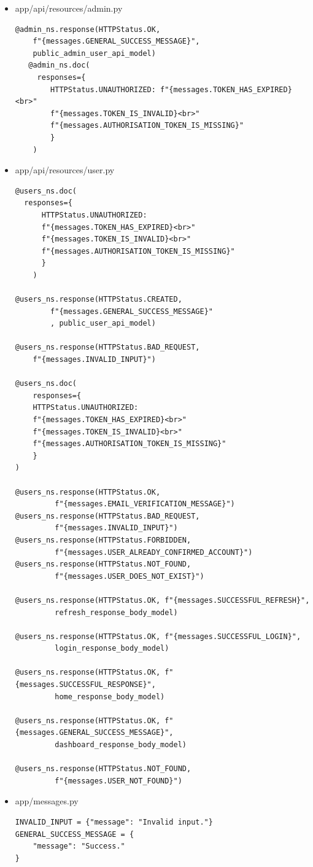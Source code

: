 \documentclass{article}
\begin{document}
\begin{itemize}
  \item app/api/resources/admin.py 
\lstset{language=Python}
\begin{lstlisting}
@admin_ns.response(HTTPStatus.OK, 
    f"{messages.GENERAL_SUCCESS_MESSAGE}",
    public_admin_user_api_model)
   @admin_ns.doc(	  
     responses={	    
        HTTPStatus.UNAUTHORIZED: f"{messages.TOKEN_HAS_EXPIRED}<br>"
        f"{messages.TOKEN_IS_INVALID}<br>"	    
        f"{messages.AUTHORISATION_TOKEN_IS_MISSING}"
        }	        
    )	    
\end{lstlisting}
 \item app/api/resources/user.py
\lstset{language=Python}
\begin{lstlisting}
@users_ns.doc(
  responses={	  
      HTTPStatus.UNAUTHORIZED:
      f"{messages.TOKEN_HAS_EXPIRED}<br>"	       
      f"{messages.TOKEN_IS_INVALID}<br>"	      
      f"{messages.AUTHORISATION_TOKEN_IS_MISSING}"	           
      }	        
    )	    

@users_ns.response(HTTPStatus.CREATED, 
        f"{messages.GENERAL_SUCCESS_MESSAGE}"
        , public_user_api_model)

@users_ns.response(HTTPStatus.BAD_REQUEST, 
    f"{messages.INVALID_INPUT}")

@users_ns.doc(
    responses={
    HTTPStatus.UNAUTHORIZED: 
    f"{messages.TOKEN_HAS_EXPIRED}<br>"
    f"{messages.TOKEN_IS_INVALID}<br>" 
    f"{messages.AUTHORISATION_TOKEN_IS_MISSING}"
    }
)

@users_ns.response(HTTPStatus.OK, 
         f"{messages.EMAIL_VERIFICATION_MESSAGE}")
@users_ns.response(HTTPStatus.BAD_REQUEST, 
         f"{messages.INVALID_INPUT}")
@users_ns.response(HTTPStatus.FORBIDDEN, 
         f"{messages.USER_ALREADY_CONFIRMED_ACCOUNT}")
@users_ns.response(HTTPStatus.NOT_FOUND,
         f"{messages.USER_DOES_NOT_EXIST}")

@users_ns.response(HTTPStatus.OK, f"{messages.SUCCESSFUL_REFRESH}",
         refresh_response_body_model)

@users_ns.response(HTTPStatus.OK, f"{messages.SUCCESSFUL_LOGIN}",
         login_response_body_model)

@users_ns.response(HTTPStatus.OK, f"{messages.SUCCESSFUL_RESPONSE}",
         home_response_body_model)

@users_ns.response(HTTPStatus.OK, f"{messages.GENERAL_SUCCESS_MESSAGE}", 
         dashboard_response_body_model)

@users_ns.response(HTTPStatus.NOT_FOUND,
         f"{messages.USER_NOT_FOUND}")
\end{lstlisting}
 \item app/messages.py
\lstset{language=Python}
\begin{lstlisting}
INVALID_INPUT = {"message": "Invalid input."}
GENERAL_SUCCESS_MESSAGE = {
    "message": "Success."
}


\end{lstlisting}
\end{itemize}
\end{document}
